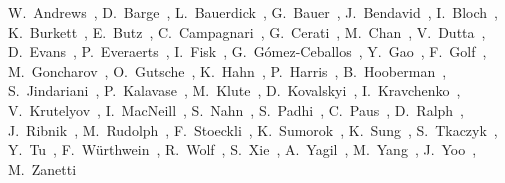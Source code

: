\begin{Authlist}
%
W.~Andrews~, 
D.~Barge~, 
L.~Bauerdick~, 
G.~Bauer~,
J.~Bendavid~,
I.~Bloch~, 
K.~Burkett~, 
E.~Butz~,
C.~Campagnari~, 
G.~Cerati~,
M.~Chan~,
V.~Dutta~,
D.~Evans~, 
P.~Everaerts~,
I.~Fisk~, 
G.~G\'omez-Ceballos~,
Y.~Gao~, 
F.~Golf~, 
M.~Goncharov~,
O.~Gutsche~, 
K.~Hahn~,
P.~Harris~,
B.~Hooberman~,
S.~Jindariani~,
P.~Kalavase~, 
M.~Klute~,
D.~Kovalskyi~, 
I.~Kravchenko~,
V.~Krutelyov~, 
I.~MacNeill~,
S.~Nahn~,
S.~Padhi~, 
C.~Paus~,
D.~Ralph~,
J.~Ribnik~,
M.~Rudolph~,
F.~Stoeckli~,
K.~Sumorok~,
K.~Sung~,
S.~Tkaczyk~,
Y.~Tu~, 
F.~W\"urthwein~, 
R.~Wolf~,
S.~Xie~,
A.~Yagil~, 
M.~Yang~,
J.~Yoo~,
M.~Zanetti~
%
\end{Authlist}
